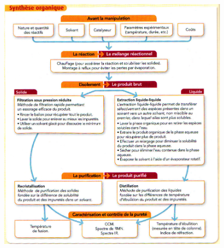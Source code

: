 \documentclass[11pt,a4paper]{article}
\begin{document}
\begin{figure}[H]
    \centering
    \includegraphics[width=\linewidth]{imgs/c5/recapSynth.jpg}
\end{figure}
\end{document}
